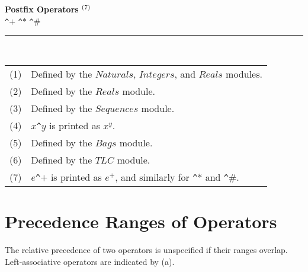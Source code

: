 \documentclass[fleqn,leqno]{article}
\newcommand{\notemark}[1]{$^{\mbox{\tiny(#1)}}$}
\begin{document}
\vspace{2\baselineskip}

\noindent
\textbf{Postfix Operators} \notemark{7}\\[.4em]
\verb|^|$+$%
\verb|^|$*$ %
\verb|^|$\#$ 


% 


\rule{.2\textwidth}{.4pt}\\
{\footnotesize\begin{tabular}[t]{@{}l@{\ }l}
  (1)& Defined by the $Naturals$, $Integers$, and $Reals$ modules.\\[.1em]
  (2)& Defined by the $Reals$ module.\\[.1em]
  (3)& Defined by the $Sequences$ module.\\[.1em]
  (4)& $x$\verb|^|$y$ is printed as $x^{y}$.\\[.1em]
  (5) & Defined by the $Bags$ module.\\[.1em]
  (6) & Defined by the $TLC$ module. \\[.1em]
  (7) & $e$\verb|^|$+$ is printed as $e^{+}$\s{-.2}, and similarly for
        \verb|^|$*$ and \verb|^|$\#$. %
\end{tabular}}

\newpage

\section*{Precedence Ranges of Operators}

The relative precedence of two operators is unspecified if
their ranges overlap.  Left-associative operators are indicated by
{\small(a)}.
\end{document}
